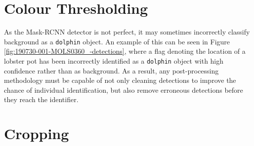 


\section{Colour Thresholding}\label{ch:postProcessing,sec:splittingByComponent}

As the Mask-RCNN detector is not perfect, it may sometimes incorrectly classify background as a \texttt{dolphin} object. An example of this can be seen in Figure \ref{fig:190730-001-MOLS0360_-detections}, where a flag denoting the location of a lobster pot has been incorrectly identified as a \texttt{dolphin} object with high confidence rather than as background. As a result, any post-processing methodology must be capable of not only cleaning detections to improve the chance of individual identification, but also remove erroneous detections before they reach the identifier. 



\section{Cropping}\label{ch:postProcessing,sec:cropping}


